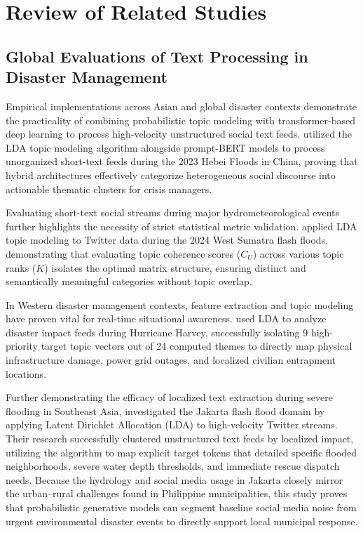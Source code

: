 \documentclass[12pt,a4paper]{report}
\begin{document}
\section{Review of Related Studies}

\subsection{Global Evaluations of Text Processing in Disaster Management}

Empirical implementations across Asian and global disaster contexts demonstrate
the practicality of combining probabilistic topic modeling with
transformer-based deep learning to process high-velocity unstructured social
text feeds. \parencite{zang2026} utilized the LDA topic modeling algorithm
alongside prompt-BERT models to process unorganized short-text feeds during the
2023 Hebei Floods in China, proving that hybrid architectures effectively
categorize heterogeneous social discourse into actionable thematic clusters for
crisis managers.

Evaluating short-text social streams during major hydrometeorological events
further highlights the necessity of strict statistical metric validation.
\parencite{anggara2025} applied LDA topic modeling to Twitter data during the 2024
West Sumatra flash floods, demonstrating that evaluating topic coherence
scores ($C_U$) across various topic ranks ($K$) isolates the optimal matrix
structure, ensuring distinct and semantically meaningful categories without
topic overlap.

In Western disaster management contexts, feature extraction and topic modeling
have proven vital for real-time situational awareness. \parencite{mihunov2022} used
LDA to analyze disaster impact feeds during Hurricane Harvey, successfully
isolating 9 high-priority target topic vectors out of 24 computed themes to
directly map physical infrastructure damage, power grid outages, and localized
civilian entrapment locations.

Further demonstrating the efficacy of localized text extraction during severe
flooding in Southeast Asia, \parencite{rahmadan2020} investigated the Jakarta flash
flood domain by applying Latent Dirichlet Allocation (LDA) to high-velocity
Twitter streams. Their research successfully clustered unstructured text feeds
by localized impact, utilizing the algorithm to map explicit target tokens that
detailed specific flooded neighborhoods, severe water depth thresholds, and
immediate rescue dispatch needs. Because the hydrology and social media usage
in Jakarta closely mirror the urban--rural challenges found in Philippine
municipalities, this study proves that probabilistic generative models can
segment baseline social media noise from urgent environmental disaster events
to directly support local municipal response.
\end{document}
